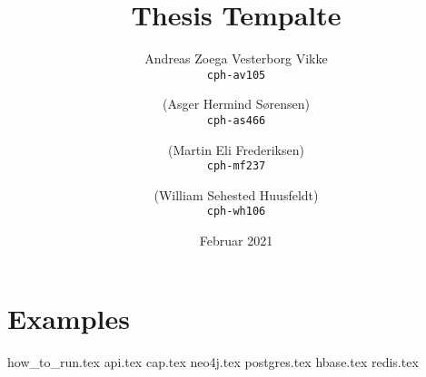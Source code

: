 \documentclass[a4paper,12pt]{report}
\title{Thesis Tempalte}
\author{
    Andreas Zoega Vesterborg Vikke\\
    \texttt{cph-av105}
    \and
    (Asger Hermind Sørensen)\\
    \texttt{cph-as466}
    \and
    (Martin Eli Frederiksen)\\
    \texttt{cph-mf237}
    \and
    (William Sehested Huusfeldt)\\
    \texttt{cph-wh106}
}
\date{Februar 2021}
\begin{document}
\listoftodos
{}

\maketitle
\tableofcontents

\chapter{Examples}
{how_to_run.tex}
{api.tex}
{cap.tex}
{neo4j.tex}
{postgres.tex}
{hbase.tex}
{redis.tex}

\newpage


\end{document}
